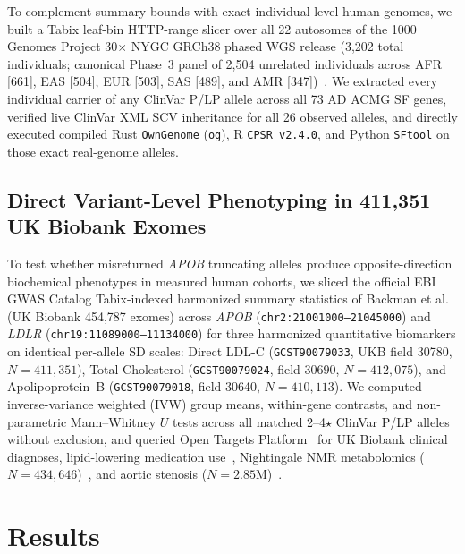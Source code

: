 \documentclass[11pt,letterpaper]{article}
\begin{document}
To complement summary bounds with exact individual-level human genomes, we built a Tabix leaf-bin HTTP-range slicer over all 22 autosomes of the 1000 Genomes Project 30$\times$ NYGC GRCh38 phased WGS release (3,202 total individuals; canonical Phase~3 panel of 2,504 unrelated individuals across AFR [661], EAS [504], EUR [503], SAS [489], and AMR [347])~\citep{byrskabishop2022_1kg}. We extracted every individual carrier of any ClinVar P/LP allele across all 73 AD ACMG SF genes, verified live ClinVar XML SCV inheritance for all 26 observed alleles, and directly executed compiled Rust \texttt{OwnGenome} (\texttt{og}), R \texttt{CPSR v2.4.0}, and Python \texttt{SFtool} on those exact real-genome alleles.

\subsection{Direct Variant-Level Phenotyping in 411,351 UK Biobank Exomes}
To test whether misreturned \textit{APOB} truncating alleles produce opposite-direction biochemical phenotypes in measured human cohorts, we sliced the official EBI GWAS Catalog Tabix-indexed harmonized summary statistics of Backman et al.~\citep{backman2021ukbexome} (UK Biobank 454,787 exomes) across \textit{APOB} (\texttt{chr2:21001000--21045000}) and \textit{LDLR} (\texttt{chr19:11089000--11134000}) for three harmonized quantitative biomarkers on identical per-allele SD scales: Direct LDL-C (\texttt{GCST90079033}, UKB field 30780, $N=411{,}351$), Total Cholesterol (\texttt{GCST90079024}, field 30690, $N=412{,}075$), and Apolipoprotein~B (\texttt{GCST90079018}, field 30640, $N=410{,}113$). We computed inverse-variance weighted (IVW) group means, within-gene contrasts, and non-parametric Mann--Whitney $U$ tests across all matched 2--4$\star$ ClinVar P/LP alleles without exclusion, and queried Open Targets Platform~\citep{buniello2025opentargets} for UK Biobank clinical diagnoses, lipid-lowering medication use~\citep{backman2021ukbexome,karczewski2025panukb}, Nightingale NMR metabolomics ($N=434{,}646$)~\citep{zoodsma2025nmr}, and aortic stenosis ($N=2.85\text{M}$)~\citep{small2026as}.

\section{Results}
\end{document}
